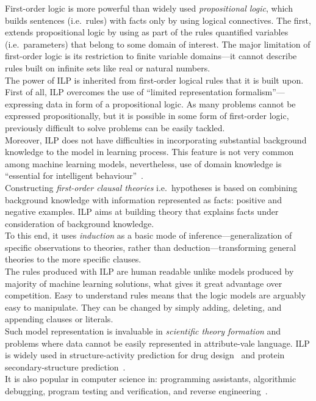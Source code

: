 \documentclass[12pt, a4paper, pdflatex, leqno, twoside, openright]{report}
\begin{document}
First-order logic is more powerful than widely used \emph{propositional logic}, which builds sentences (i.e.\ rules) with facts only by using logical connectives. The first, extends propositional logic by using as part of the rules quantified variables (i.e.\ parameters) that belong to some domain of interest. The major limitation of first-order logic is its restriction to finite variable domains---it cannot describe rules built on infinite sets like real or natural numbers.\\ %

The power of ILP is inherited from first-order logical rules that it is built upon. First of all, ILP overcomes the use of ``limited representation formalism''---expressing data in form of a propositional logic. As many problems cannot be expressed propositionally, but it is possible in some form of first-order logic, previously difficult to solve problems can be easily tackled.\\
Moreover, ILP does not have difficulties in incorporating substantial background knowledge to the model in learning process. This feature is not very common among machine learning models, nevertheless, use of domain knowledge is ``essential for intelligent behaviour''~\citep{muggleton1994inductive}.\\

Constructing \emph{first-order clausal theories} i.e.\ hypotheses is based on combining background knowledge with information represented as facts: positive and negative examples. ILP aims at building theory that explains facts under consideration of background knowledge.\\
To this end, it uses \emph{induction} as a basic mode of inference---generalization of specific observations to theories, rather than deduction---transforming general theories to the more specific clauses.\\

The rules produced with ILP are human readable unlike models produced by majority of machine learning solutions, what gives it great advantage over competition. Easy to understand rules means that the logic models are arguably easy to manipulate. They can be changed by simply adding, deleting, and appending clauses or literals.\\

Such model representation is invaluable in \emph{scientific theory formation} and problems where data cannot be easily represented in attribute-vale language. ILP is widely used in structure-activity prediction for drug design~\citep{king1992drug,michael1992modelling} and protein secondary-structure prediction~\citep{muggleton1992protein}.\\
It is also popular in computer science in: programming assistants, algorithmic debugging, program testing and verification, and reverse engineering~\citep{shapiro1983algorithmic,bergadno1993inductive,bratko1993inductive}.\\
\end{document}
